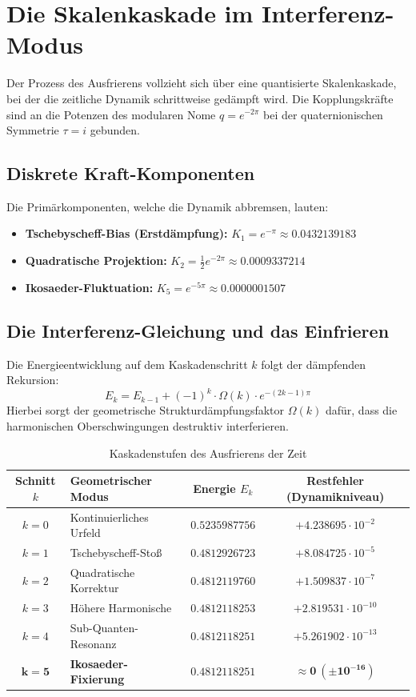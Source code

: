 \documentclass[11pt,a4paper]{article}
\begin{document}
\section{Die Skalenkaskade im Interferenz-Modus}
Der Prozess des Ausfrierens vollzieht sich über eine quantisierte Skalenkaskade, bei der die zeitliche Dynamik schrittweise gedämpft wird. Die Kopplungskräfte sind an die Potenzen des modularen Nome $q = e^{-2\pi}$ bei der quaternionischen Symmetrie $\tau = i$ gebunden.

\subsection{Diskrete Kraft-Komponenten}
Die Primärkomponenten, welche die Dynamik abbremsen, lauten:
\begin{itemize}
    \item \textbf{Tschebyscheff-Bias (Erstdämpfung):} $K_1 = e^{-\pi} \approx 0.0432139183$
    \item \textbf{Quadratische Projektion:} $K_2 = \frac{1}{2}e^{-2\pi} \approx 0.0009337214$
    \item \textbf{Ikosaeder-Fluktuation:} $K_5 = e^{-5\pi} \approx 0.0000001507$
\end{itemize}

\subsection{Die Interferenz-Gleichung und das Einfrieren}
Die Energieentwicklung auf dem Kaskadenschritt $k$ folgt der dämpfenden Rekursion:
\begin{equation}
E_k = E_{k-1} + (-1)^k \cdot \Omega(k) \cdot e^{-(2k-1)\pi}
\end{equation}
Hierbei sorgt der geometrische Strukturdämpfungsfaktor $\Omega(k)$ dafür, dass die harmonischen Oberschwingungen destruktiv interferieren.

\begin{table}[h!]
\centering
\caption{Kaskadenstufen des Ausfrierens der Zeit}
\vspace{2mm}
\begin{tabular}{clcc}
\toprule
Schnitt $k$ & Geometrischer Modus & Energie $E_k$ & Restfehler (Dynamikniveau) \\
\midrule
$k=0$ & Kontinuierliches Urfeld & $0.5235987756$ & $+4.238695 \cdot 10^{-2}$ \\
$k=1$ & Tschebyscheff-Stoß & $0.4812926723$ & $+8.084725 \cdot 10^{-5}$ \\
$k=2$ & Quadratische Korrektur & $0.4812119760$ & $+1.509837 \cdot 10^{-7}$ \\
$k=3$ & Höhere Harmonische & $0.4812118253$ & $+2.819531 \cdot 10^{-10}$ \\
$k=4$ & Sub-Quanten-Resonanz & $0.4812118251$ & $+5.261902 \cdot 10^{-13}$ \\
$\mathbf{k=5}$ & \textbf{Ikosaeder-Fixierung} & $\mathbf{0.4812118251}$ & $\mathbf{\approx 0 \ (\pm 10^{-16})}$ \\
\bottomrule
\end{tabular}
\end{table}
\end{document}
